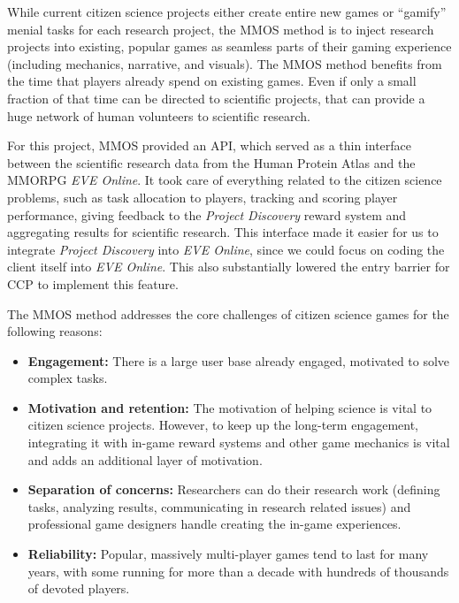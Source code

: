 While current citizen science projects either create entire new games or ``gamify'' menial tasks for each research project, the MMOS method is to inject research projects into existing, popular games as seamless parts of their gaming experience (including mechanics, narrative, and visuals). The MMOS method benefits from the time that players already spend on existing games. Even if only a small fraction of that time can be directed to scientific projects, that can provide a huge network of human volunteers to scientific research.

For this project, MMOS provided an API, which served as a thin interface between the scientific research data from the Human Protein Atlas and the MMORPG \emph{EVE Online}. It took care of everything related to the citizen science problems, such as task allocation to players, tracking and scoring player performance, giving feedback to the \emph{Project Discovery} reward system and aggregating results for scientific research. This interface made it easier for us to integrate \emph{Project Discovery} into \emph{EVE Online}, since we could focus on coding the client itself into \emph{EVE Online}. This also substantially lowered the entry barrier for CCP to implement this feature.

The MMOS method addresses the core challenges of citizen science games for the following reasons:

\begin{itemize}
\item {\bf Engagement:} There is a large user base already engaged, motivated to solve complex tasks.

\item {\bf Motivation and retention:} The motivation of helping 
science is vital to citizen science projects. However, to keep up the long-term engagement, integrating it with in-game reward systems and other game mechanics is vital and adds an additional layer of motivation.

\item {\bf Separation of concerns:} Researchers can do their research work (defining tasks, analyzing results, communicating in research related issues) and professional game designers handle creating the in-game experiences.

\item {\bf Reliability:} Popular, massively multi-player games tend to last for many years, with some running for more than a decade with hundreds of thousands of devoted players.
\end{itemize}

